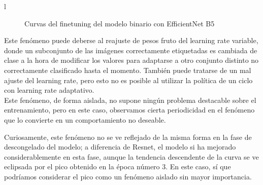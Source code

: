l\begin{figure}[H]
	\centering
	\caption{Curvas del finetuning del modelo binario con EfficientNet B5}
	\label{fig:curvasefnetbinaria}
\end{figure}

Este fenómeno puede deberse al reajuste de pesos fruto del learning rate variable, donde un subconjunto de las imágenes correctamente etiquetadas es cambiada de clase a la hora de modificar los valores para adaptarse a otro conjunto distinto no correctamente clasificado hasta el momento. También puede tratarse de un mal ajuste del learning rate, pero esto no es posible al utilizar la política de un ciclo con learning rate adaptativo.\\

Este fenómeno, de forma aislada, no supone ningún problema destacable sobre el entrenamiento, pero en este caso, observamos  cierta periodicidad en el fenómeno que lo convierte en un comportamiento no deseable.

Curiosamente, este fenómeno no se ve reflejado de la misma forma en la fase de descongelado del modelo; a diferencia de Resnet, el modelo si ha mejorado considerablemente en esta fase, aunque la tendencia descendente de la curva se ve eclipsada por el pico obtenido en la época número 3. En este caso, sí que podríamos considerar el pico como un fenómeno aislado sin mayor importancia.

